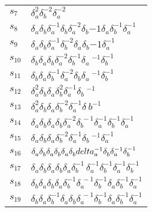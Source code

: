 \documentclass{article}
\begin{document}
\begin{center}
\begin{tabular}{ll}
$s_{7}$ & $\delta_a^{2}\delta_b^{-2}\delta_a^{-2}$ \\
$s_{8}$ & $\delta_a^{}\delta_b^{}\delta_a^{-1}\delta_b^{}\delta_a^{-2}\delta_b^\
{-1}\delta_a^{}\delta_b^{-1}\delta_a^{-1}$ \\
$s_{9}$ & $\delta_a^{}\delta_b^{}\delta_a^{-1}\delta_b^{-2}\delta_a^{}\delta_b^\
{-1}\delta_a^{-1}$ \\
$s_{10}$ & $\delta_b^{}\delta_a^{}\delta_b^{}\delta_a^{-2}\delta_b^{-1}\delta_a\
^{-1}\delta_b^{-1}$ \\
$s_{11}$ & $\delta_b^{}\delta_a^{}\delta_b^{-1}\delta_a^{-2}\delta_b^{}\delta_a\
^{-1}\delta_b^{-1}$ \\
$s_{12}$ & $\delta_a^{2}\delta_b^{}\delta_a^{}\delta_b^{2}\delta_a^{-1}\delta_b\
^{-1}$ \\
$s_{13}$ & $\delta_a^{2}\delta_b^{}\delta_a^{}\delta_b^{-2}\delta_a^{-1}\delta_\
b^{-1}$ \\
$s_{14}$ & $\delta_a^{}\delta_b^{}\delta_a^{}\delta_b^{}\delta_a^{-2}\delta_b^{\
-1}\delta_a^{-1}\delta_b^{-1}\delta_a^{-1}$ \\
$s_{15}$ & $\delta_a^{}\delta_b^{}\delta_a^{}\delta_b^{-2}\delta_a^{-1}\delta_b\
^{-1}\delta_a^{-1}$ \\
$s_{16}$ & $\delta_a^{}\delta_b^{}\delta_a^{}\delta_b^{}\delta_a^{}\delta_b^{}\\
delta_a^{-1}\delta_b^{}\delta_a^{-1}\delta_b^{-1}$ \\
$s_{17}$ & $\delta_a^{}\delta_b^{}\delta_a^{}\delta_b^{}\delta_a^{}\delta_b^{-1\
}\delta_a^{-1}\delta_b^{-1}\delta_a^{-1}\delta_b^{-1}$ \\
$s_{18}$ & $\delta_b^{}\delta_a^{}\delta_b^{}\delta_a^{}\delta_b^{-1}\delta_a^{\
-1}\delta_b^{-1}\delta_a^{}\delta_b^{-1}\delta_a^{-1}$ \\
$s_{19}$ & $\delta_b^{}\delta_a^{}\delta_b^{-1}\delta_a^{}\delta_b^{}\delta_a^{\
-1}\delta_b^{-1}\delta_a^{}\delta_b^{-1}\delta_a^{-1}$ \\
\bottomrule
\end{tabular}
\end{center}

\thispagestyle{empty}
\end{document}
